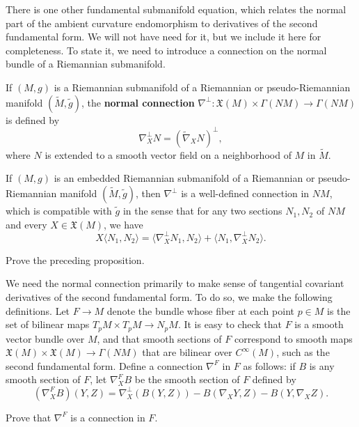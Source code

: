 There is one other fundamental submanifold equation, which relates the normal part of the ambient curvature endomorphism to derivatives of the second fundamental form. We will not have need for it, but we include it here for completeness. To state it, we need to introduce a connection on the normal bundle of a Riemannian submanifold.

If $(M, g)$ is a Riemannian submanifold of a Riemannian or pseudo-Riemannian manifold $(\tilde{M}, \tilde{g})$, the \textbf{normal connection} $\nabla^\perp: \mathfrak{X}(M) \times \Gamma(NM) \to \Gamma(NM)$ is defined by
\[
\nabla^\perp_X N = (\tilde{\nabla}_X N)^\perp,
\]
where $N$ is extended to a smooth vector field on a neighborhood of $M$ in $\tilde{M}$.

\begin{proposition}
\label{prop:normal-connection-well-defined}
If $(M, g)$ is an embedded Riemannian submanifold of a Riemannian or pseudo-Riemannian manifold $(\tilde{M}, \tilde{g})$, then $\nabla^\perp$ is a well-defined connection in $NM$, which is compatible with $\tilde{g}$ in the sense that for any two sections $N_1, N_2$ of $NM$ and every $X \in \mathfrak{X}(M)$, we have
\[
X\langle N_1, N_2 \rangle = \langle \nabla^\perp_X N_1, N_2 \rangle + \langle N_1, \nabla^\perp_X N_2 \rangle.
\]
\end{proposition}

\begin{exercise}
\label{exer:prove-normal-connection}
Prove the preceding proposition.
\end{exercise}

We need the normal connection primarily to make sense of tangential covariant derivatives of the second fundamental form. To do so, we make the following definitions. Let $F \to M$ denote the bundle whose fiber at each point $p \in M$ is the set of bilinear maps $T_p M \times T_p M \to N_p M$. It is easy to check that $F$ is a smooth vector bundle over $M$, and that smooth sections of $F$ correspond to smooth maps $\mathfrak{X}(M) \times \mathfrak{X}(M) \to \Gamma(NM)$ that are bilinear over $C^\infty(M)$, such as the second fundamental form. Define a connection $\nabla^F$ in $F$ as follows: if $B$ is any smooth section of $F$, let $\nabla^F_X B$ be the smooth section of $F$ defined by
\[
(\nabla^F_X B)(Y, Z) = \nabla^\perp_X(B(Y, Z)) - B(\nabla_X Y, Z) - B(Y, \nabla_X Z).
\]

\begin{exercise}
\label{exer:connection-in-bundle}
Prove that $\nabla^F$ is a connection in $F$.
\end{exercise}


